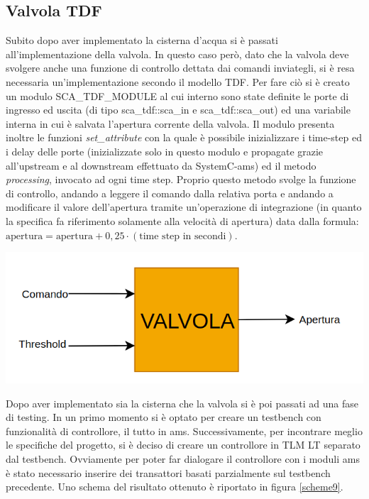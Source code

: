 \documentclass[]{IEEEtran}
\begin{document}
\subsection{Valvola TDF}
Subito dopo aver implementato la cisterna d'acqua si è passati all'implementazione della valvola. In questo caso però, dato che la valvola deve svolgere anche una funzione di controllo dettata dai comandi inviategli, si è resa necessaria un'implementazione secondo il modello TDF. Per fare ciò si è creato un modulo SCA\_TDF\_MODULE al cui interno sono state definite le porte di ingresso ed uscita (di tipo sca\_tdf::sca\_in e sca\_tdf::sca\_out) ed una variabile interna in cui è salvata l'apertura corrente della valvola. Il modulo presenta inoltre le funzioni \emph{set\_attribute} con la quale è possibile inizializzare i time-step ed i delay delle porte (inizializzate solo in questo modulo e propagate grazie all'upstream e al downstream effettuato da SystemC-ams) ed il metodo \emph{processing}, invocato ad ogni time step. Proprio questo metodo svolge la funzione di controllo, andando a leggere il comando dalla relativa porta e andando a modificare il valore dell'apertura tramite un'operazione di integrazione (in quanto la specifica fa riferimento solamente alla velocità di apertura) data dalla formula: $\text{apertura}=\text{apertura}+0,25\cdot(\text{time step in secondi})$.
\begin{center}
	\includegraphics[width=\columnwidth]{Images/scheme8.png}
	\label{scheme8}
\end{center}

Dopo aver implementato sia la cisterna che la valvola si è poi passati ad una fase di testing. In un primo momento si è optato per creare un testbench con funzionalità di controllore, il tutto in ams. Successivamente, per incontrare meglio le specifiche del progetto, si è deciso di creare un controllore in TLM LT separato dal testbench. Ovviamente per poter far dialogare il controllore con i moduli ams è stato necessario inserire dei transattori basati parzialmente sul testbench precedente. Uno schema del risultato ottenuto è riportato in figura \ref{scheme9}.
\end{document}
